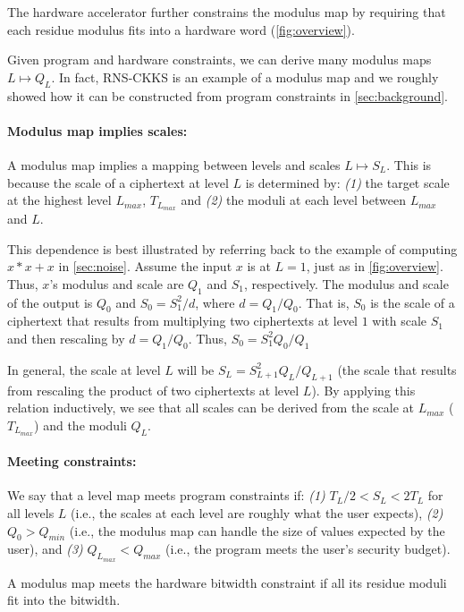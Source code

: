 The hardware accelerator further constrains the modulus map by
requiring that each residue modulus fits into a hardware word
(\autoref{fig:overview}).


Given program and hardware constraints, we can derive many modulus maps $L
\mapsto Q_L$.
In fact, RNS-CKKS is an example of a modulus map and we roughly showed how it
can be constructed from program constraints in \autoref{sec:background}.

\paragraph{Modulus map implies scales:}
A modulus map implies a mapping between levels and scales $L \mapsto S_L$.
This is because the scale of a ciphertext at level $L$ is determined by:
\emph{(1)} the target scale at the highest level $L_{max}$, $T_{L_{max}}$ and
\emph{(2)} the moduli at each level between $L_{max}$ and $L$.

This dependence is best illustrated by referring back to the example of
computing $x \ast x + x$ in \autoref{sec:noise}.
Assume the input $x$ is at $L = 1$, just as in \autoref{fig:overview}.
Thus, $x$'s modulus and scale are $Q_1$ and $S_1$, respectively.
The modulus and scale of the output is $Q_0$ and $S_0 = S_1^2/d$, where $d =
Q_1/Q_0$.
That is, $S_0$ is the scale of a ciphertext that results from multiplying two
ciphertexts at level $1$ with scale $S_1$ and then rescaling by $d = Q_1/Q_0$.
Thus, $S_0 = S_1^2Q_0/Q_1$

In general, the scale at level $L$ will be $S_L = S_{L+1}^2Q_L/Q_{L+1}$ (the
scale that results from rescaling the product of two ciphertexts at level $L$).
By applying this relation inductively, we see that all scales can be derived
from the scale at $L_{max}$ ($T_{L_{max}}$) and the moduli $Q_L$.

\paragraph{Meeting constraints:}
We say that a level map meets program constraints if:
\emph{(1)} $T_L/2 < S_L < 2T_L$ for all levels $L$ (i.e., the scales at each
level are roughly what the user expects),
\emph{(2)} $Q_0 > Q_{min}$ (i.e., the modulus map can handle the size of values
expected by the user), and
\emph{(3)} $Q_{L_{max}} < Q_{max}$ (i.e., the program meets the user's security
budget).

A modulus map meets the hardware bitwidth constraint if all its residue moduli
fit into the bitwidth.

